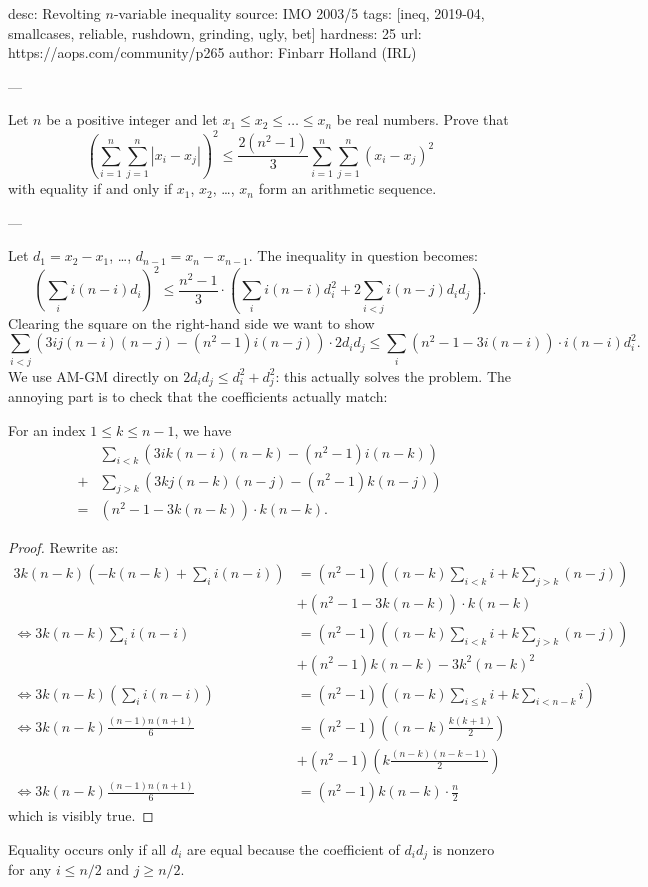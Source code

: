 desc: Revolting $n$-variable inequality
source: IMO 2003/5
tags: [ineq, 2019-04, smallcases, reliable, rushdown, grinding, ugly, bet]
hardness: 25
url: https://aops.com/community/p265
author: Finbarr Holland (IRL)

---

Let $n$ be a positive integer and
let $x_1 \le x_2 \le \dots \le x_n$ be real numbers.
Prove that
\[ \left(\sum_{i=1}^{n}\sum_{j=1}^{n} |x_i - x_j|\right)^2
  \le \frac{2(n^2-1)}{3}\sum_{i=1}^{n}\sum_{j=1}^{n} (x_i - x_j)^2 \]
with equality if and only if $x_1$, $x_2$, \dots, $x_n$
form an arithmetic sequence.

---

Let $d_1 = x_2 - x_1$, \dots, $d_{n-1} = x_n - x_{n-1}$.
The inequality in question becomes:
\[
  \left( \sum_i i(n-i) d_i \right)^2
  \le
  \frac{n^2-1}{3} \cdot
  \left( \sum_i i(n-i) d_i^2 + 2\sum_{i<j} i(n-j) d_i d_j  \right).
\]
Clearing the square on the right-hand side we want to show
\[
  \sum_{i<j} \left( 3ij(n-i)(n-j) - (n^2-1)i(n-j) \right) \cdot 2d_i d_j
  \le \sum_i (n^2-1-3i(n-i)) \cdot i(n-i) d_i^2.
\]
We use AM-GM directly on $2d_i d_j \le d_i^2 + d_j^2$:
this actually solves the problem.
The annoying part is to check that the coefficients actually match:
\begin{claim*}
  For an index $1 \le k \le n-1$, we have
  \begin{align*}
    &\sum_{i<k} \left( 3ik(n-i)(n-k) - (n^2-1)i(n-k) \right) \\
    +& \sum_{j>k} \left( 3kj(n-k)(n-j) - (n^2-1)k(n-j) \right) \\
    = & (n^2-1-3k(n-k)) \cdot k(n-k).
  \end{align*}
\end{claim*}
\begin{proof}
  Rewrite as:
  \begin{align*}
    3k(n-k) \left( -k(n-k) + \sum_i i(n-i) \right)
      &= (n^2-1)\left( (n-k)\sum_{i<k} i + k\sum_{j>k} (n-j) \right) \\
      &+ (n^2-1-3k(n-k)) \cdot k(n-k) \\
    \iff 3k(n-k) \sum_i i(n-i)
      &= (n^2-1) \left( (n-k)\sum_{i<k} i + k\sum_{j>k}(n-j) \right) \\
      &+ (n^2-1)k(n-k) - 3k^2(n-k)^2 \\
    \iff 3k(n-k) \left( \sum_{i} i(n-i) \right)
      &= (n^2-1) \left( (n-k)\sum_{i \le k} i + k \sum_{i < n-k} i \right) \\
    \iff 3k(n-k) \frac{(n-1)n(n+1)}{6}
      &= (n^2-1) \left( (n-k)\frac{k(k+1)}{2} \right) \\
      & + (n^2-1) \left( k \frac{(n-k)(n-k-1)}{2} \right) \\
    \iff 3k(n-k) \frac{(n-1)n(n+1)}{6}
      &= (n^2-1)k(n-k) \cdot \frac n2
  \end{align*}
  which is visibly true.
\end{proof}
Equality occurs only if all $d_i$ are equal
because the coefficient of $d_i d_j$ is nonzero
for any $i \le n/2$ and $j \ge n/2$.

